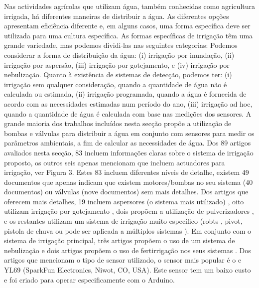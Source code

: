 \documentclass[conference]{IEEEtran}
\begin{document}
Nas actividades agrícolas que utilizam água, também conhecidas 
como agricultura irrigada, há diferentes maneiras de distribuir a água. 
As diferentes opções apresentam eficiência diferente e, em alguns casos, 
uma forma específica deve ser utilizada para uma cultura específica. 
As formas específicas de irrigação têm uma grande variedade, mas podemos 
dividi-las nas seguintes categorias: Podemos considerar a forma de 
distribuição da água: (i) irrigação por inundação, (ii) irrigação por 
aspersão, (iii) irrigação por gotejamento, e (iv) irrigação por nebulização. 
Quanto à existência de sistemas de detecção, podemos ter: (i) irrigação 
sem qualquer consideração, quando a quantidade de água não é calculada ou 
estimada, (ii) irrigação programada, quando a água é fornecida de acordo 
com as necessidades estimadas num período do ano, (iii) irrigação ad hoc, 
quando a quantidade de água é calculada com base nas medições dos sensores. 
A grande maioria dos trabalhos incluídos nesta secção propõe a utilização de 
bombas e válvulas para distribuir a água em conjunto com sensores para medir os 
parâmetros ambientais, a fim de calcular as necessidades de água. Dos 89 
artigos avaliados nesta secção, 83 incluem informações claras sobre o 
sistema de irrigação proposto, os outros seis apenas mencionam que incluem 
actuadores para irrigação, ver Figura 3. Estes 83 incluem diferentes níveis 
de detalhe, existem 49 documentos que apenas indicam que existem motores/bombas 
no seu sistema (40 documentos) ou válvulas (nove documentos) sem mais detalhes. 
Dos artigos que oferecem mais detalhes, 19 incluem aspersores (o sistema 
mais utilizado) \cite{gonzalez2018iot, ahmed2016intelligation, yusuf2005information, cambra2017iot, arvind2017automated, ammour2018factory, singh2019iot, wu2016secure, solanki2017conceptual, wasson2017integration, johar2018iot, ryu2015design, reche2014smart, chieochan2017internet, arumugam2018internet, boonchieng2018smart, rawal2017iot, guo2015design, khattab2016design}, 
oito utilizam irrigação por gotejamento \cite{daskalakis2018uw, nawandar2019iot, barkunan2019smart, sivaprasath2016arduino, kumar2017internet, kodali2016iot, abidin2015web, banumathi2017android}, dois propõem a 
utilização de pulverizadores \cite{mechsy2017mobile}, e os restantes utilizam 
um sistema de irrigação muito específico (robts \cite{rahul2018iot}, pivot, 
pistola de chuva \cite{vasu2017intelligent} ou pode ser aplicada a múltiplos 
sistemas \cite{agale2017automated}). Em conjunto com o sistema de irrigação principal, 
três artigos propõem o uso de um sistema de nebulização \cite{chieochan2017internet, boonchieng2018smart, kodali2016iot} e dois artigos 
propõem o uso de fertirrigação nos seus sistemas \cite{arumugam2018internet, abidin2015web}.
Dos artigos que mencionam o tipo de sensor utilizado, o sensor mais popular é o 
e YL69 (SparkFun Electronics, Niwot, CO, USA). Este sensor tem um baixo custo e 
foi criado para operar especificamente com o Arduino. \cite{garcia2020iot}
\end{document}
